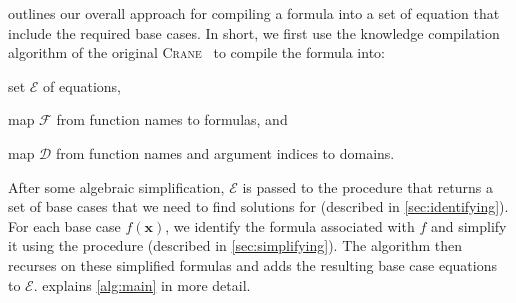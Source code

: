 \documentclass{article}
\theoremstyle{definition}
\begin{document}
 outlines our overall approach for compiling a formula into a set
of equation that include the required base cases. In short, we first use the
knowledge compilation algorithm of the original
\textsc{Crane}~\cite{DBLP:conf/kr/DilkasB23} to compile the formula into:
\begin{enumerate*}[label=(\roman*)]
  \item set $\mathcal{E}$ of equations,
  \item map $\mathcal{F}$ from function names to formulas, and
  \item map $\mathcal{D}$ from function names and argument indices to domains.
\end{enumerate*}
After some algebraic simplification, $\mathcal{E}$ is passed to the
\FindBaseCases procedure that returns a set of base cases that we need to find
solutions for (described in \cref{sec:identifying}). For each base case
$f(\mathbf{x})$, we identify the formula associated with $f$ and simplify it
using the \Propagate procedure (described in \cref{sec:simplifying}). The
algorithm then recurses on these simplified formulas and adds the resulting base
case equations to $\mathcal{E}$.  explains \cref{alg:main}
in more detail.
\end{document}
